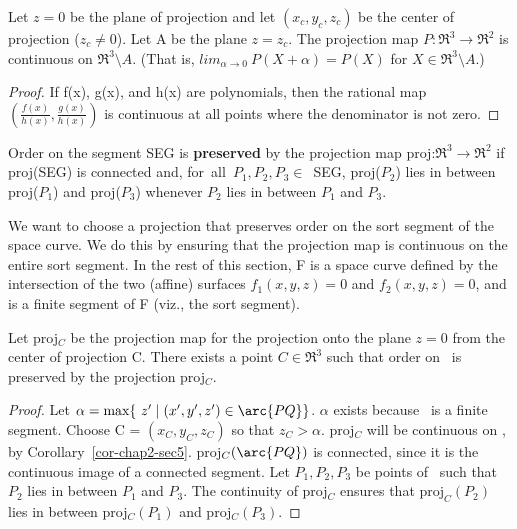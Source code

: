 \begin{corollary}
\label{cor-chap2-sec5}
Let $z=0$ be the plane of projection and let $(x_{c},y_{c},z_{c})$
be the center of projection ($z_{c} \neq 0$).
Let A be the plane $z = z_{c}$.
The projection map $P:\Re^{3} \rightarrow \Re^{2}$ is continuous on 
$\Re^{3} \setminus A$.
(That is, \mbox{$lim_{\alpha \rightarrow 0}\ P(X+\alpha) = P(X)$} for
$X \in \Re^{3} \setminus A$.)
\end{corollary}
\begin{proof}
If f(x), g(x), and h(x) are polynomials, then the rational map
$(\frac{f(x)}{h(x)},\frac{g(x)}{h(x)})$ is continuous at all points where 
the denominator is not zero.
\end{proof}
%
\begin{definition}
Order on the segment SEG is {\bf preserved} by the projection map
\mbox{proj:$\Re^{3} \rightarrow \Re^{2}$}
if proj(SEG) is connected and,
\mbox{for all $P_{1},P_{2},P_{3} \in $ SEG},
proj($P_{2}$) lies in between proj($P_{1}$) and proj($P_{3}$)
whenever $P_{2}$ lies in between $P_{1}$ and $P_{3}$.
\end{definition}

We want to choose a projection that preserves order on the sort segment
of the space curve.
We do this by ensuring that the projection map is continuous on the 
entire sort segment.
In the rest of this section, F is a space curve defined by 
the intersection of the two
(affine) surfaces 
$f_{1}(x,y,z) = 0$ and $f_{2}(x,y,z) = 0$,
and  is a finite segment of F (viz., the sort segment).
%
\begin{lemma}
\label{thm-orderpreserve}
Let \mbox{proj$_{C}$} be the projection map for the projection onto the plane
$z=0$ from the center of projection C.
There exists a point $C \in \Re^{3}$ such that order on \ is 
preserved by the projection \mbox{proj$_{C}$}.
\end{lemma}
%
\begin{proof}
Let $\alpha = \mbox{max} \{\ z' \mid (x',y',z') \in \arc{PQ} \}$.
$\alpha$ exists because \ is a finite segment.
Choose C = $(x_{C},y_{C},z_{C})$ so that $z_{C} > \alpha$.
proj$_{C}$ will be continuous on , by 
Corollary~\ref{cor-chap2-sec5}.
proj$_{C}(\arc{PQ})$ is connected, since it is the continuous image of a 
connected segment.
Let $P_{1},P_{2},P_{3}$ be points of \ such that $P_{2}$ lies
in between $P_{1}$ and $P_{3}$.
The continuity of proj$_{C}$ ensures that 
$\mbox{proj}_{C}(P_{2})$ lies in between proj$_{C}(P_{1})$ and 
proj$_{C}(P_{3})$.
\end{proof}

